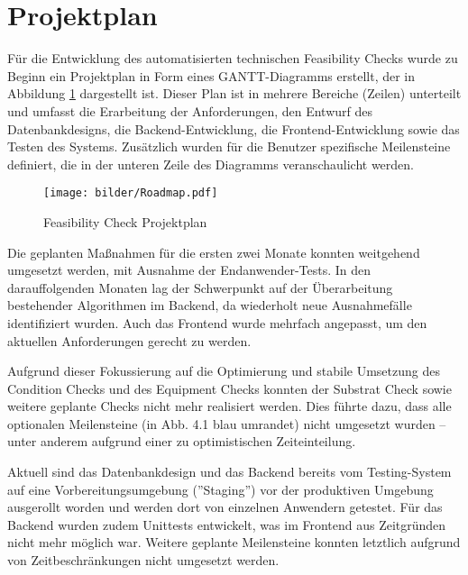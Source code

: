 \section{Projektplan}
Für die Entwicklung des automatisierten technischen Feasibility Checks wurde zu Beginn ein Projektplan in Form eines GANTT-Diagramms erstellt, der in Abbildung \ref{fig:roadmap} dargestellt ist. Dieser Plan ist in mehrere Bereiche (Zeilen) unterteilt und umfasst die Erarbeitung der Anforderungen, den Entwurf des Datenbankdesigns, die Backend-Entwicklung, die Frontend-Entwicklung sowie das Testen des Systems. Zusätzlich wurden für die Benutzer spezifische Meilensteine definiert, die in der unteren Zeile des Diagramms veranschaulicht werden.

\begin{figure}[!htbp]
    \centering
    \texttt{[image: bilder/Roadmap.pdf]}
    \caption{Feasibility Check Projektplan}
    \label{fig:roadmap}
\end{figure}

Die geplanten Maßnahmen für die ersten zwei Monate konnten weitgehend umgesetzt werden, mit Ausnahme der Endanwender-Tests. In den darauffolgenden Monaten lag der Schwerpunkt auf der Überarbeitung bestehender Algorithmen im Backend, da wiederholt neue Ausnahmefälle identifiziert wurden. Auch das Frontend wurde mehrfach angepasst, um den aktuellen Anforderungen gerecht zu werden.

Aufgrund dieser Fokussierung auf die Optimierung und stabile Umsetzung des Condition Checks und des Equipment Checks konnten der Substrat Check sowie weitere geplante Checks nicht mehr realisiert werden. Dies führte dazu, dass alle optionalen Meilensteine (in Abb. 4.1 blau umrandet) nicht umgesetzt wurden – unter anderem aufgrund einer zu optimistischen Zeiteinteilung.

Aktuell sind das Datenbankdesign und das Backend bereits vom Testing-System auf eine Vorbereitungsumgebung (''Staging'') vor der produktiven Umgebung ausgerollt worden und werden dort von einzelnen Anwendern getestet. Für das Backend wurden zudem Unittests entwickelt, was im Frontend aus Zeitgründen nicht mehr möglich war. Weitere geplante Meilensteine konnten letztlich aufgrund von Zeitbeschränkungen nicht umgesetzt werden.